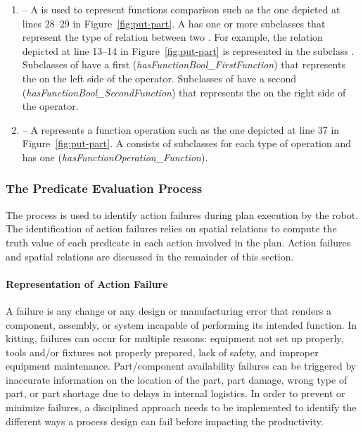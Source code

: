 \begin{enumerate}
\item {} -- A  is used to represent functions comparison such as the one depicted at lines 28--29 in Figure~\ref{fig:put-part}. A  has one or more subclasses that represent the type of relation between two . For example, the relation depicted at line 13--14 in Figure~\ref{fig:put-part} is represented in the subclass . Subclasses of  have a first  (\emph{hasFunctionBool\_FirstFunction}) that represents the  on the left side of the operator. Subclasses of  have a second  (\emph{hasFunctionBool\_SecondFunction}) that represents the  on the right side of the operator.
\item {} -- A  represents a function operation such as the one depicted at line 37 in Figure~\ref{fig:put-part}. A  consists of subclasses for each type of operation and  has one  (\emph{hasFunctionOperation\_Function}).
\end{enumerate}


\subsubsection{The Predicate Evaluation Process}
The  process is used to identify action failures during plan execution by the robot. The identification of action failures relies on spatial relations to compute the truth value of each predicate in each action involved in the plan. Action failures and spatial relations are discussed in the remainder of this section.


\paragraph{Representation of Action Failure}\label{sss:failure}
 A failure is any change or any design or manufacturing error that renders a component, assembly, or system incapable of performing its intended function. In kitting, failures can occur for multiple reasons: equipment not set up properly, tools and/or fixtures not properly prepared, lack of safety, and improper equipment maintenance. Part/component availability failures can be triggered by inaccurate information on the location of the part, part damage, wrong type of part, or part shortage due to delays in internal logistics. In order to prevent or minimize failures, a disciplined approach needs to be implemented to identify the different ways a process design can fail before impacting the productivity.

